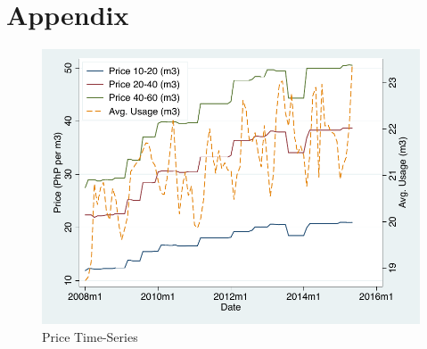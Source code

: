 \documentclass[12pt,table]{article}
\newcommand{\regtext}{
Standard errors are clustered at the small-area level (in parentheses).  The water service area is divided into 2,974 small-areas.
\textsuperscript{c} p$<$0.10,\textsuperscript{b} p$<$0.05,\textsuperscript{a} p$<$0.01 \,\,
}
\begin{document}




\section{Appendix}







% 







\begin{figure}
\caption{Price Time-Series}\label{figure:pricetimeseries}
\begin{center}
\includegraphics[scale=1]{tables/price_series.pdf}
\end{center}
\end{figure}
\end{document}
